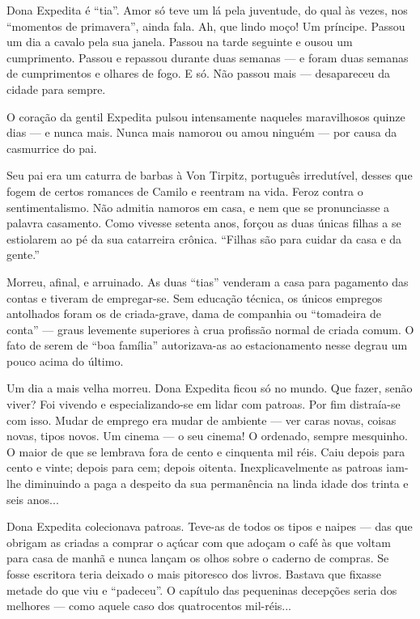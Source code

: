 Dona Expedita é ``tia''. Amor só teve um lá pela juventude, do qual às
vezes, nos ``momentos de primavera'', ainda fala. Ah, que lindo moço! Um
príncipe. Passou um dia a cavalo pela sua janela. Passou na tarde
seguinte e ousou um cumprimento. Passou e repassou durante duas semanas
--- e foram duas semanas de cumprimentos e olhares de fogo. E só. Não
passou mais --- desapareceu da cidade para sempre.

O coração da gentil Expedita pulsou intensamente naqueles maravilhosos
quinze dias --- e nunca mais. Nunca mais namorou ou amou ninguém --- por
causa da casmurrice do pai.

Seu pai era um caturra de barbas à Von Tirpitz, português irredutível,
desses que fogem de certos romances de Camilo e reentram na vida. Feroz
contra o sentimentalismo. Não admitia namoros em casa, e nem que se
pronunciasse a palavra casamento. Como vivesse setenta anos, forçou as
duas únicas filhas a se estiolarem ao pé da sua catarreira crônica.
``Filhas são para cuidar da casa e da gente.''

Morreu, afinal, e arruinado. As duas ``tias'' venderam a casa para
pagamento das contas e tiveram de empregar-se. Sem educação técnica, os
únicos empregos antolhados foram os de criada-grave, dama de companhia
ou ``tomadeira de conta'' --- graus levemente superiores à crua
profissão normal de criada comum. O fato de serem de ``boa família''
autorizava-as ao estacionamento nesse degrau um pouco acima do último.

Um dia a mais velha morreu. Dona Expedita ficou só no mundo. Que fazer,
senão viver? Foi vivendo e especializando-se em lidar com patroas. Por
fim distraía-se com isso. Mudar de emprego era mudar de ambiente --- ver
caras novas, coisas novas, tipos novos. Um cinema --- o seu cinema! O
ordenado, sempre mesquinho. O maior de que se lembrava fora de cento e
cinquenta mil réis. Caiu depois para cento e vinte; depois para cem;
depois oitenta. Inexplicavelmente as patroas iam-lhe diminuindo a paga a
despeito da sua permanência na linda idade dos trinta e seis anos...

Dona Expedita colecionava patroas. Teve-as de todos os tipos e naipes
--- das que obrigam as criadas a comprar o açúcar com que adoçam o café
às que voltam para casa de manhã e nunca lançam os olhos sobre o caderno
de compras. Se fosse escritora teria deixado o mais pitoresco dos
livros. Bastava que fixasse metade do que viu e ``padeceu''. O capítulo
das pequeninas decepções seria dos melhores --- como aquele caso dos
quatrocentos mil-réis...

